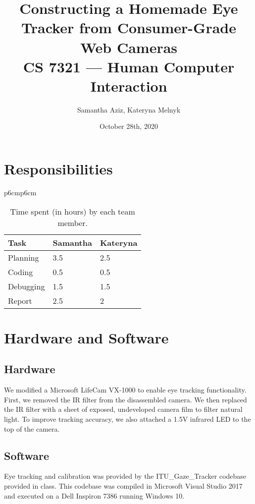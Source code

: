 \documentclass[11pt]{article}
\begin{document}
\title{Constructing a Homemade Eye Tracker from Consumer-Grade Web Cameras \\ CS 7321 — Human Computer Interaction}
\author{Samantha Aziz, Kateryna Melnyk}  %
\date{October 28th, 2020}
\maketitle

\section{Responsibilities} %
    \begin{table}[h!]
        \begin{center}
        \begin{tabular}{p{6cm}p{6cm}}
            \begin{tabular}{lll}
            \toprule
            Task & Samantha & Kateryna \\
            \midrule
            Planning & 3.5 & 2.5 \\
            \midrule
            Coding & 0.5 & 0.5 \\
            \midrule
            Debugging & 1.5 & 1.5 \\
            \midrule
            Report & 2.5 & 2 \\
            \bottomrule
            \end{tabular}
        \end{tabular}
        \caption{Time spent (in hours) by each team member.}
   \end{center}
   \end{table}

\section{Hardware and Software} %
\label{setup}   
\subsection{Hardware} 
We modified a Microsoft LifeCam VX-1000 to enable eye tracking functionality. First, we removed the IR filter from the disassembled camera. We then replaced the IR filter with a sheet of exposed, undeveloped camera film to filter natural light. To improve tracking accuracy, we also attached a 1.5V infrared LED to the top of the camera. \\

\subsection{Software}
Eye tracking and calibration was provided by the ITU\_Gaze\_Tracker codebase provided in class. This codebase was compiled in Microsoft Visual Studio 2017 and executed on a Dell Inspiron 7386 running Windows 10.
\end{document}
